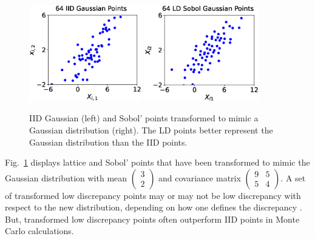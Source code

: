 \documentclass[11pt]{NSFamsart}
\begin{document}
\begin{figure}
	\centering
	\includegraphics[height = 4.2cm]{ProgramsImages/Gauss_IID.eps} 
	\includegraphics[height = 4.2cm]{ProgramsImages/Gauss_Sobol.eps}
	\caption{IID Gaussian (left) and Sobol'  points transformed to mimic a Gaussian distribution (right).  The LD points better represent the Gaussian distribution than the IID points. \label{fig:ld_Gauss}}
\end{figure}

Fig.\ \ref{fig:ld_Gauss} displays  lattice and Sobol' points that have been transformed to mimic the Gaussian distribution with mean $\begin{pmatrix} 3 \\ 2 \end{pmatrix}$ and covariance matrix $\begin{pmatrix} 9 & 5 \\ 5 & 4 \end{pmatrix}$.  A set of transformed low discrepancy points may or may not be low discrepancy with respect to the new distribution, depending on how one defines the discrepancy \cite{LiKanHic20a}.  But, transformed low discrepancy points often outperform IID points in Monte Carlo calculations.

\end{document}
